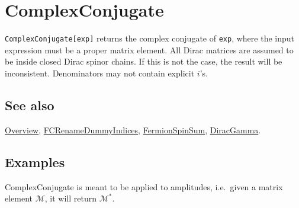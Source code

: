\documentclass[../FeynCalcManual.tex]{subfiles}
\begin{document}
\hypertarget{complexconjugate}{
\section{ComplexConjugate}\label{complexconjugate}}

\texttt{ComplexConjugate[\allowbreak{}exp]} returns the complex
conjugate of \texttt{exp}, where the input expression must be a proper
matrix element. All Dirac matrices are assumed to be inside closed Dirac
spinor chains. If this is not the case, the result will be inconsistent.
Denominators may not contain explicit \(i\)'s.

\subsection{See also}

\hyperlink{toc}{Overview},
\hyperlink{fcrenamedummyindices}{FCRenameDummyIndices},
\hyperlink{fermionspinsum}{FermionSpinSum},
\hyperlink{diracgamma}{DiracGamma}.

\subsection{Examples}

ComplexConjugate is meant to be applied to amplitudes, i.e.~given a
matrix element \(\mathcal{M}\), it will return \(\mathcal{M}^\ast\).
\end{document}
